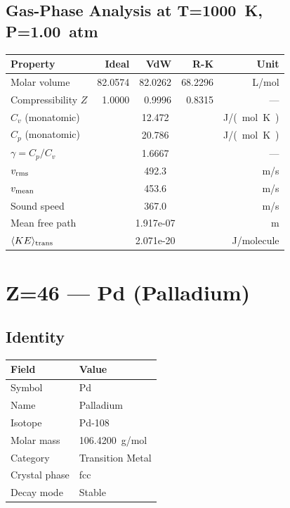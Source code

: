 \documentclass[11pt,a4paper]{article}
\begin{document}
\subsection{Gas-Phase Analysis at T=\SI{1000}{K}, P=\SI{1.00}{atm}}
\begin{tabular}{lrrrr}
  \toprule
  Property & Ideal & VdW & R-K & Unit \\
  \midrule
  Molar volume & 82.0574 & 82.0262 & 68.2296 & \si{L/mol} \\
  Compressibility $Z$ & 1.0000 & 0.9996 & 0.8315 & --- \\
  \midrule
  $C_v$ (monatomic) & \multicolumn{3}{c}{12.472} & \si{J/(mol.K)} \\
  $C_p$ (monatomic) & \multicolumn{3}{c}{20.786} & \si{J/(mol.K)} \\
  $\gamma = C_p/C_v$ & \multicolumn{3}{c}{1.6667} & --- \\
  $v_{\rm rms}$ & \multicolumn{3}{c}{492.3} & \si{m/s} \\
  $v_{\rm mean}$ & \multicolumn{3}{c}{453.6} & \si{m/s} \\
  Sound speed & \multicolumn{3}{c}{367.0} & \si{m/s} \\
  Mean free path & \multicolumn{3}{c}{1.917e-07} & \si{m} \\
  $\langle KE \rangle_{\rm trans}$ & \multicolumn{3}{c}{2.071e-20} & \si{J/molecule} \\
  \bottomrule
\end{tabular}

\newpage

\section{Z=46 --- Pd (Palladium)}
\label{sec:Z46}

\subsection{Identity}
\begin{tabular}{ll}
  \toprule
  Field & Value \\
  \midrule
  Symbol & Pd \\
  Name & Palladium \\
  Isotope & Pd-108 \\
  Molar mass & \SI{106.4200}{g/mol} \\
  Category & Transition Metal \\
  Crystal phase & fcc \\
  Decay mode & Stable \\
  \bottomrule
\end{tabular}
\end{document}
